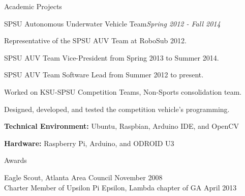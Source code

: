 \documentclass[11pt]{resume} %
\begin{document}
\begin{rSection}{Academic Projects}

\begin{rSubsection}{SPSU Autonomous Underwater Vehicle Team}{\em Spring 2012 - Fall 2014}{}{}

\item Representative of the SPSU AUV Team at RoboSub 2012.
\item SPSU AUV Team Vice-President from Spring 2013 to Summer 2014.
\item SPSU AUV Team Software Lead from Summer 2012 to present.
\item Worked on KSU-SPSU Competition Teams, Non-Sports consolidation team.
\item Designed, developed, and tested the competition vehicle's programming.
\item \textbf{Technical Environment:} Ubuntu, Raspbian, Arduino IDE, and OpenCV
\item \textbf{Hardware:} Raspberry Pi, Arduino, and ODROID U3
\end{rSubsection}

\end{rSection}


\begin{rSection}{Awards}

{Eagle Scout, Atlanta Area Council} \hfill November 2008\\
{Charter Member of Upsilon Pi Epsilon, Lambda chapter of GA} \hfill April 2013 \\

\end{rSection}






\end{document}
